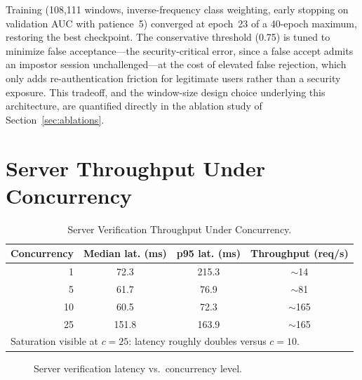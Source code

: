 \documentclass[12pt,a4paper,oneside]{report}
\begin{document}
Training (108{,}111 windows, inverse-frequency class weighting, early
stopping on validation AUC with patience~5) converged at epoch~23 of a
40-epoch maximum, restoring the best checkpoint. The conservative
threshold (0.75) is tuned to minimize false acceptance---the
security-critical error, since a false accept admits an impostor session
unchallenged---at the cost of elevated false rejection, which only adds
re-authentication friction for legitimate users rather than a security
exposure. This tradeoff, and the window-size design choice underlying
this architecture, are quantified directly in the ablation study of
Section~\ref{sec:ablations}.

\section{Server Throughput Under Concurrency}

\begin{table}[htbp]
\renewcommand{\arraystretch}{1.25}
\caption{Server Verification Throughput Under Concurrency.}
\label{tab:throughput}
\centering
\begin{tabular}{rccc}
\toprule
\textbf{Concurrency} & \textbf{Median lat. (ms)} & \textbf{p95 lat. (ms)} & \textbf{Throughput (req/s)} \\
\midrule
1  & 72.3  & 215.3 & $\sim$14   \\
5  & 61.7  & 76.9  & $\sim$81   \\
10 & 60.5  & 72.3  & $\sim$165  \\
25 & 151.8 & 163.9 & $\sim$165  \\
\bottomrule
\multicolumn{4}{l}{\footnotesize Saturation visible at $c{=}25$: latency roughly doubles versus $c{=}10$.}
\end{tabular}
\end{table}

\begin{figure}[htbp]
\centering
{}
\caption{Server verification latency vs.\ concurrency level.}
\label{fig:throughput_graph}
\end{figure}
\end{document}
